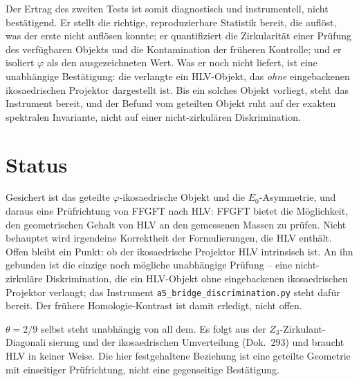 Der Ertrag des zweiten Tests ist somit diagnostisch und instrumentell, nicht bestätigend. Er
stellt die richtige, reproduzierbare Statistik bereit, die auflöst, was der erste nicht auflösen
konnte; er quantifiziert die Zirkularität einer Prüfung des verfügbaren Objekts und die
Kontamination der früheren Kontrolle; und er isoliert $\varphi$ als den ausgezeichneten Wert.
Was er noch nicht liefert, ist eine unabhängige Bestätigung: die verlangte ein HLV-Objekt, das
\emph{ohne} eingebackenen ikosaedrischen Projektor dargestellt ist. Bis ein solches Objekt
vorliegt, steht das Instrument bereit, und der Befund vom geteilten Objekt ruht
auf der exakten spektralen Invariante, nicht auf einer nicht-zirkulären Diskrimination.

\section{Status}
Gesichert ist das geteilte $\varphi$-ikosaedrische Objekt und die $E_0$-Asymmetrie, und daraus
eine Prüfrichtung von FFGFT nach HLV: FFGFT bietet die Möglichkeit, den geometrischen Gehalt von
HLV an den gemessenen Massen zu prüfen. Nicht behauptet wird irgendeine Korrektheit der
Formulierungen, die HLV enthält. Offen bleibt ein Punkt: ob der ikosaedrische Projektor HLV
intrinsisch ist. An ihn gebunden ist die einzige noch mögliche unabhängige Prüfung -- eine
nicht-zirkuläre Diskrimination, die ein HLV-Objekt ohne eingebackenen ikosaedrischen Projektor
verlangt; das Instrument \texttt{a5\_bridge\_discrimination.py} steht dafür bereit.
Der frühere Homologie-Kontrast ist damit erledigt, nicht offen.

$\theta=2/9$ selbst steht unabhängig von all dem. Es folgt aus der $Z_3$-Zirkulant-Diagonali\-
sierung und der ikosaedrischen Umverteilung (Dok.~293) und braucht HLV in keiner Weise. Die hier
festgehaltene Beziehung ist eine geteilte Geometrie mit einseitiger Prüfrichtung, nicht eine
gegenseitige Bestätigung.
